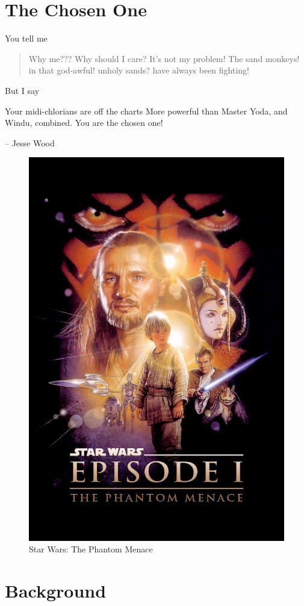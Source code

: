 \documentclass[16pt,openany,oneside]{book}
\begin{document}
\chapter{The Chosen One}

You tell me

\begin{quote}
    Why me???
    Why should I care?
    It's not my problem!
    The sand monkeys!
    in that god-awful!
    unholy sands?
    have always been fighting!
\end{quote}

\noindent But I say

\epigraph{
    Your midi-chlorians are off the charts
    More powerful than Master Yoda, and Windu, combined.
    You are the chosen one!
}{-- Jesse Wood}


\begin{figure}[H]
    \centering
    \includegraphics[width=0.5\linewidth]{assets/star_wars/phantom_menace.jpg}
    \caption{Star Wars: The Phantom Menace}
    \label{fig:phantom-menace-poster}
\end{figure}

\chapter{Background}
\end{document}
